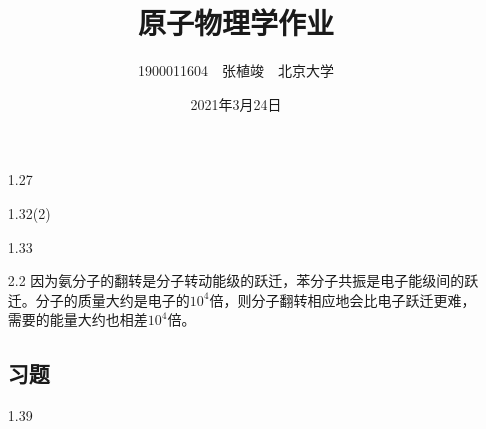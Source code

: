 \documentclass[a4paper,fontset=none]{ctexart}
\begin{document}
    \title{\textbf{原子物理学作业}}
    \author{1900011604\ \ 张植竣\ \ 北京大学}
    \date{2021年3月24日}

    \maketitle

    \begin{itemize}

        \subsection*{思考题}

        \item[1.27]


        \item[1.32(2)]


        \item[1.33]


        \item[2.2]
        因为氨分子的翻转是分子转动能级的跃迁，苯分子共振是电子能级间的跃迁。分子的质量大约是电子的$10^4$倍，则分子翻转相应地会比电子跃迁更难，需要的能量大约也相差$10^4$倍。

        \subsection*{习题}

        \item[1.39]



\end{itemize}
\end{document}

